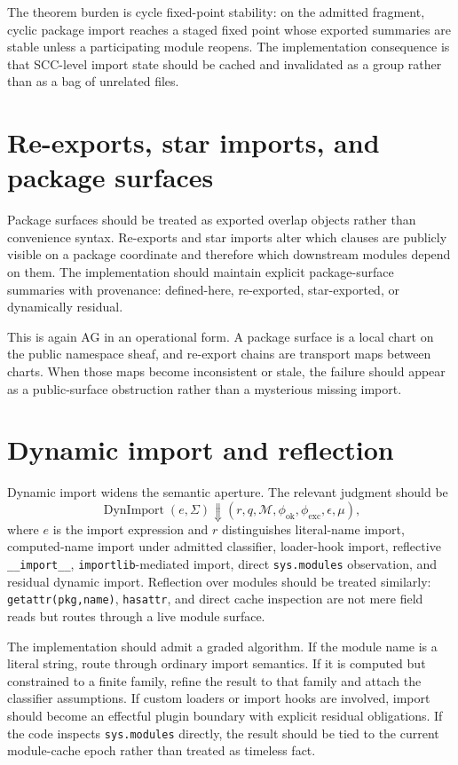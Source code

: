 \documentclass[11pt]{report}
\begin{document}
The theorem burden is cycle fixed-point stability: on the admitted fragment, cyclic package import reaches a staged fixed point whose exported summaries are stable unless a participating module reopens. The implementation consequence is that SCC-level import state should be cached and invalidated as a group rather than as a bag of unrelated files.
\section{Re-exports, star imports, and package surfaces}
Package surfaces should be treated as exported overlap objects rather than convenience syntax. Re-exports and star imports alter which clauses are publicly visible on a package coordinate and therefore which downstream modules depend on them. The implementation should maintain explicit package-surface summaries with provenance: defined-here, re-exported, star-exported, or dynamically residual.

This is again AG in an operational form. A package surface is a local chart on the public namespace sheaf, and re-export chains are transport maps between charts. When those maps become inconsistent or stale, the failure should appear as a public-surface obstruction rather than a mysterious missing import.
\section{Dynamic import and reflection}
Dynamic import widens the semantic aperture. The relevant judgment should be
\[
\operatorname{DynImport}(e,\Sigma) \Downarrow (r,q,\mathcal{M},\phi_{\mathrm{ok}},\phi_{\mathrm{exc}},\epsilon,\mu),
\]
where $e$ is the import expression and $r$ distinguishes literal-name import, computed-name import under admitted classifier, loader-hook import, reflective \texttt{\_\_import\_\_}, \texttt{importlib}-mediated import, direct \texttt{sys.modules} observation, and residual dynamic import. Reflection over modules should be treated similarly: \texttt{getattr(pkg,name)}, \texttt{hasattr}, and direct cache inspection are not mere field reads but routes through a live module surface.

The implementation should admit a graded algorithm. If the module name is a literal string, route through ordinary import semantics. If it is computed but constrained to a finite family, refine the result to that family and attach the classifier assumptions. If custom loaders or import hooks are involved, import should become an effectful plugin boundary with explicit residual obligations. If the code inspects \texttt{sys.modules} directly, the result should be tied to the current module-cache epoch rather than treated as timeless fact.
\end{document}
